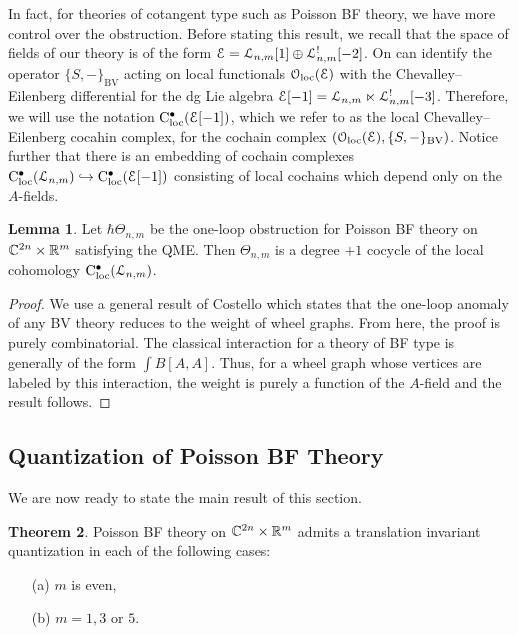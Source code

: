 \documentclass[11pt, oneside, reqno]{amsart}
\theoremstyle{definition} \newtheorem{definition}{Definition}[section]
\newtheorem{lemma}[definition]{Lemma}
\newtheorem{theorem}[definition]{Theorem}
\theoremstyle{definition}
\theoremstyle{remark}
\theoremstyle{definition} \newtheorem{remark}[definition]{Remark}
\theoremstyle{definition} \newtheorem{remarks}[definition]{Remarks}
\theoremstyle{definition} \newtheorem{question}[definition]{Question}
\theoremstyle{definition} \newtheorem*{note}{Note}
\theoremstyle{definition} \newtheorem{example}[definition]{Example}
\theoremstyle{definition} \newtheorem{examples}[definition]{Examples}
\def\cloc{{\rm C}_{\rm loc}}
\def\oloc{\mathcal{O}_{\rm loc}}
\def\bu{\bullet}
\def\cE{\mathcal E}\def\cF{\mathcal F}\def\cG{\mathcal G}\def\cH{\mathcal H}
\newcommand{\mr}[1]{\mathrm{#1}}
\begin{document}
In fact, for theories of cotangent type such as Poisson BF theory, we have more control over the obstruction. 
Before stating this result, we recall that the space of fields of our theory is of the form $\cE = \cL_{n,m} [1] \oplus \cL_{n,m}^! [-2]$. 
On can identify the operator $\{S, -\}_{\mr{BV}}$ acting on local functionals $\oloc(\cE)$ with the Chevalley--Eilenberg differential for the dg Lie algebra $\cE[-1] = \cL_{n,m} \ltimes \cL_{n,m}^![-3]$. 
Therefore, we will use the notation $\cloc^\bu(\cE[-1])$, which we refer to as the local Chevalley--Eilenberg cocahin complex, for the cochain complex $(\oloc(\cE), \{S,-\}_{\mr{BV}})$. 
Notice further that there is an embedding of cochain complexes $\cloc^\bu(\cL_{n,m}) \hookrightarrow \cloc^\bu(\cE[-1])$ consisting of local cochains which depend only on the $A$-fields.

\begin{lemma}\label{lemma:Atype}
Let $\hbar \Theta_{n,m}$ be the one-loop obstruction for Poisson BF theory on $\mathbb C^{2n} \times \mathbb R^m$ satisfying the QME. 
Then $\Theta_{n,m}$ is a degree $+1$ cocycle of the local cohomology $\cloc^\bu(\cL_{n,m})$. 
\end{lemma}

\begin{proof}
We use a general result of Costello \cite[Corollary 16.0.5]{CostelloWittengenus} which states that the one-loop anomaly of any BV theory reduces to the weight of wheel graphs.  From here, the proof is purely combinatorial.
The classical interaction for a theory of BF type is generally of the form $\int B [A, A]$.
Thus, for a wheel graph whose vertices are labeled by this interaction, the weight is purely a function of the $A$-field and the result follows.
\end{proof}

\subsection{Quantization of Poisson BF Theory} \label{Quantization_section}

We are now ready to state the main result of this section.

\begin{theorem} \label{thm:quantization}
Poisson BF theory on $\mathbb C^{2n} \times \mathbb R^m$ admits a translation invariant quantization in each of the following cases:
\begin{itemize}
\item[(a)] $m$ is even,
\item[(b)] $m = 1, 3$ or $5$.
\end{itemize}
\end{theorem}
\end{document}
